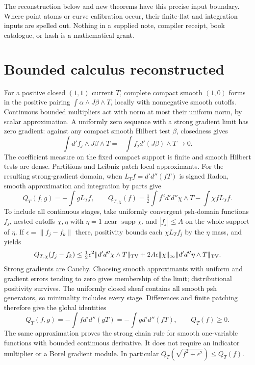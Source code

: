 \documentclass[11pt]{article}
\newcommand{\DD}{d'd''}
\begin{document}
The reconstruction below and new theorems have this precise input
boundary. Where point atoms or curve calibration occur, their finite-flat
and integration inputs are spelled out. Nothing in a supplied note,
compiler receipt, book catalogue, or hash is a mathematical grant.

\section{Bounded calculus reconstructed}
For a positive closed $(1,1)$ current $T$, complete compact smooth
$(1,0)$ forms in the positive pairing $\int\alpha\wedge J\beta\wedge T$,
locally with nonnegative smooth cutoffs. Continuous bounded multipliers
act with norm at most their uniform norm, by scalar approximation.
A uniformly zero sequence with a strong gradient limit has zero gradient:
against any compact smooth Hilbert test $\beta$, closedness gives
\[
 \int d'f_j\wedge J\beta\wedge T=-\int f_jd'(J\beta)\wedge T\longrightarrow0.
\]
The coefficient measure on the fixed compact support is finite and smooth
Hilbert tests are dense. Partitions and Leibniz patch local approximants.
For the resulting strong-gradient domain, when $L_Tf=\DD(fT)$ is signed
Radon, smooth approximation and integration by parts give
\[
 Q_T(f,g)=-\int g L_Tf,\qquad
 Q_{T,\chi}(f)=\tfrac12\int f^2\DD\chi\wedge T-\int\chi f L_Tf.
\]
To include all continuous stages, take uniformly convergent psh-domain
functions $f_j$, nested cutoffs $\chi,\eta$ with $\eta=1$ near
$\operatorname{supp}\chi$, and $|f_j|\le A$ on the whole support of
$\eta$. If $\epsilon=\|f_j-f_k\|$ there, positivity bounds each
$\chi L_Tf_j$ by the $\eta$ mass, and yields
\[
 Q_{T,\chi}(f_j-f_k)\le
 \tfrac12\epsilon^2\|\DD\chi\wedge T\|_{\rm TV}
 +2A\epsilon\|\chi\|_\infty\|\DD\eta\wedge T\|_{\rm TV}.
\]
Strong gradients are Cauchy. Choosing smooth approximants with uniform
and gradient errors tending to zero gives membership of the limit;
distributional positivity survives. The uniformly closed sheaf contains
all smooth psh generators, so minimality includes every stage. Differences
and finite patching therefore give the global identities
\begin{equation}\label{green}
 Q_T(f,g)=-\int f\DD(gT)=-\int g\DD(fT),\qquad Q_T(f)\ge0.
\end{equation}
The same approximation proves the strong chain rule for smooth
one-variable functions with bounded continuous derivative. It does not
require an indicator multiplier or a Borel gradient module. In particular
$Q_T(\sqrt{f^2+\epsilon^2})\le Q_T(f)$.
\end{document}
